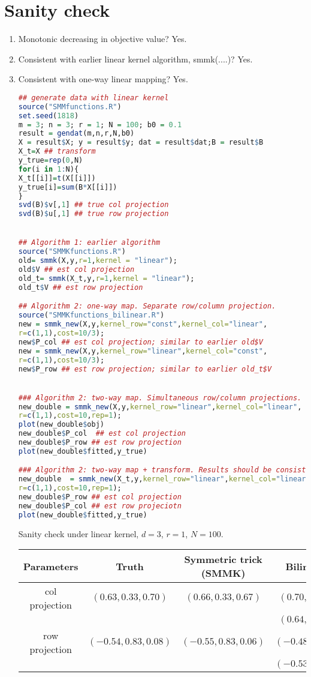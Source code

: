 \documentclass[11pt]{article}
\theoremstyle{plain}
\theoremstyle{definition}
\begin{document}
\section{Sanity check}
\begin{enumerate}
\item Monotonic decreasing in objective value? Yes. 

\item Consistent with earlier linear kernel algorithm, smmk(....)? Yes.

\item Consistent with one-way linear mapping? Yes.

\begin{lstlisting}[language=R]
## generate data with linear kernel
source("SMMfunctions.R")
set.seed(1818)
m = 3; n = 3; r = 1; N = 100; b0 = 0.1
result = gendat(m,n,r,N,b0)
X = result$X; y = result$y; dat = result$dat;B = result$B
X_t=X ## transform
y_true=rep(0,N)
for(i in 1:N){
X_t[[i]]=t(X[[i]])
y_true[i]=sum(B*X[[i]])
}
svd(B)$v[,1] ## true col projection
svd(B)$u[,1] ## true row projection


## Algorithm 1: earlier algorithm
source("SMMKfunctions.R")
old= smmk(X,y,r=1,kernel = "linear");
old$V ## est col projection
old_t= smmk(X_t,y,r=1,kernel = "linear");
old_t$V ## est row projection

## Algorithm 2: one-way map. Separate row/column projection.
source("SMMKfunctions_bilinear.R")
new = smmk_new(X,y,kernel_row="const",kernel_col="linear",
r=c(1,1),cost=10/3); 
new$P_col ## est col projection; similar to earlier old$V
new = smmk_new(X,y,kernel_row="linear",kernel_col="const",
r=c(1,1),cost=10/3);
new$P_row ## est row projection; similar to earlier old_t$V


### Algorithm 2: two-way map. Simultaneous row/column projections.
new_double = smmk_new(X,y,kernel_row="linear",kernel_col="linear",
r=c(1,1),cost=10,rep=1); 
plot(new_double$obj)
new_double$P_col  ## est col projection
new_double$P_row ## est row projection
plot(new_double$fitted,y_true)

### Algorithm 2: two-way map + transform. Results should be consistent. 
new_double  = smmk_new(X_t,y,kernel_row="linear",kernel_col="linear",
r=c(1,1),cost=10,rep=1); 
new_double$P_row ## est col projection
new_double$P_col ## est row projeciotn
plot(new_double$fitted,y_true)

\end{lstlisting}

Sanity check under linear kernel, $d=3$,  $r=1$, $N=100$.

\begin{tabular}{c|ccc}
Parameters & Truth & Symmetric trick (SMMK) & Bilinear map\\
\hline
col projection & $(0.63,0.33,0.70)$ & $(0.66,0.33,0.67)$ & $(0.70, 0.39,0.58)$\\
&&&$(0.64, 0.53,0.55)$\\
\hline
row projection & $(-0.54,0.83,0.08)$ & $(-0.55, 0.83, 0.06)$&$(-0.48,0.87,0.09)$\\
&&&$(-0.53,0.84,0.07)$\\
\end{tabular}

\end{enumerate}
\end{document}
